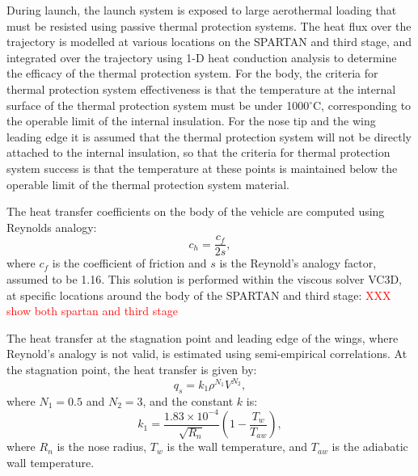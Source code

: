 During launch, the launch system is exposed to large aerothermal loading that must be resisted using passive thermal protection systems. The heat flux over the trajectory is modelled at various locations on the SPARTAN and third stage, and integrated over the trajectory using 1-D heat conduction analysis to determine the efficacy of the thermal protection system. For the body, the criteria for thermal protection system effectiveness is that the temperature at the internal surface of the thermal protection system must be under 1000$^\circ$C, corresponding to the operable limit of the internal insulation. For the nose tip and the wing leading edge it is assumed that the thermal protection system will not be directly attached to the internal insulation, so that the criteria for thermal protection system success is that the temperature at these points is maintained below the operable limit of the thermal protection system material. 

The heat transfer coefficients on the body of the vehicle are computed using Reynolds analogy: 
\begin{equation}
c_h = \frac{c_f}{2s},
\end{equation}
where $c_f$ is the coefficient of friction and $s$ is the Reynold's analogy factor, assumed to be 1.16\cite{Ward2018}. 
This solution is performed within the viscous solver VC3D, at specific locations around the body of the SPARTAN and third stage: \textcolor{red}{XXX show both spartan and third stage}

The heat transfer at the stagnation point and leading edge of the wings, where Reynold's analogy is not valid, is estimated using semi-empirical correlations\cite{Dirkx}. At the stagnation point, the heat transfer is given by\cite{Dirkx}:
\begin{equation}
q_s = k_1\rho^{N_1}V^{N_2},
\end{equation}
where $N_1 = 0.5$ and $N_2 = 3$, and the constant $k$ is\cite{Dirkx}:
\begin{equation}
k_1 = \frac{1.83 \times 10^{-4}}{\sqrt{R_n}}(1-\frac{T_w}{T_{aw}}),
\end{equation}
where $R_n$ is the nose radius, $T_w$ is the wall temperature, and $T_{aw}$ is the adiabatic wall temperature.


